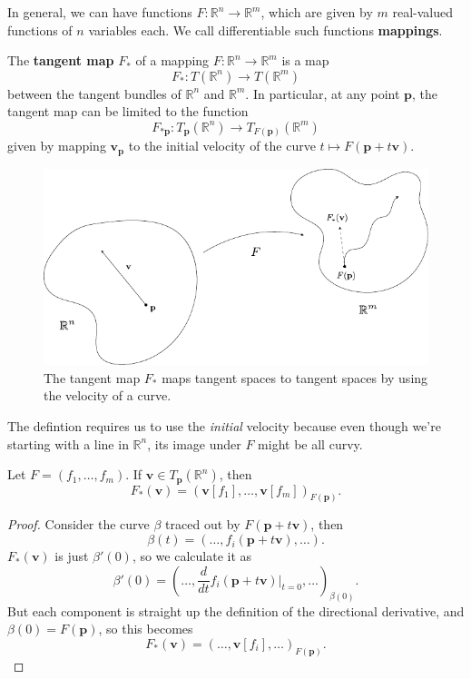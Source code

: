 \documentclass[10pt]{report}
\begin{document}
In general, we can have functions $F:\mathbb{R}^n\to \mathbb{R}^m$, which are given by $m$ real-valued functions of $n$ variables each. We call differentiable such functions \textbf{mappings}.

\begin{defn}
The \textbf{tangent map} $F_*$ of a mapping $F:\mathbb{R}^n\to \mathbb{R}^m$ is a map
\[
	F_* : T(\mathbb{R}^n) \to T(\mathbb{R}^m)
\] between the tangent bundles of $\mathbb{R}^n$ and $\mathbb{R}^m$. In particular, at any point $\mathbf{p}$, the tangent map can be limited to the function
\[
	F_{*\mathbf{p}}:T_{\mathbf{p}}(\mathbb{R}^n)\to T_{F(\mathbf{p})}(\mathbb{R}^m)
\]
given by mapping $\mathbf{v}_{\mathbf{p}}$ to the initial velocity of the curve $t\mapsto F(\mathbf{p}+t\mathbf{v})$.
\end{defn}

\begin{figure}[H]
	\centering
	\includegraphics[scale=1]{fig/tan-map.pdf}
	\caption{The tangent map $F_*$ maps tangent spaces to tangent spaces by using the velocity of a curve.}
\end{figure}

The defintion requires us to use the \textit{initial} velocity because even though we're starting with a line in $\mathbb{R}^n$, its image under $F$ might be all curvy.

\begin{prop}
	Let $F=(f_1, \dots, f_m)$. If $\mathbf{v} \in T_{\mathbf{p}}(\mathbb{R}^n)$, then
	\[
		F_{*}(\mathbf{v}) = (\mathbf{v}[f_1], \dots, \mathbf{v}[f_m])_{F(\mathbf{p})}.
	\] 
\end{prop}
\begin{proof}
	Consider the curve $\beta$ traced out by $F(\mathbf{p}+t\mathbf{v})$, then
	\[
		\beta(t) = (\dots, f_i(\mathbf{p}+t\mathbf{v}), \dots).
	\] $F_{*}(\mathbf{v})$ is just $\beta'(0)$, so we calculate it as
	\[
		\beta'(0) = \left( \dots, \frac{d }{d t} f_i(\mathbf{p}+t\mathbf{v}) \Big|_{t=0}, \dots \right)_{\beta(0)}.
	\] But each component is straight up the definition of the directional derivative, and $\beta(0) = F(\mathbf{p})$, so this becomes
	\[
		F_{*}(\mathbf{v}) = (\dots, \mathbf{v}[f_i], \dots)_{F(\mathbf{p})}.
	\] 
\end{proof}
\end{document}
